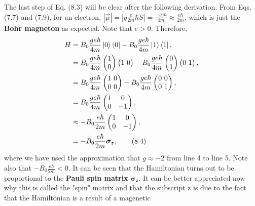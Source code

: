 \documentclass{article}
\begin{document}
The last step of Eq. (8.3) will be clear after the following derivation. From
Eqs. (7.7) and (7.9), for an electron, $|\vec{\mu}|=|g\frac{e}{2m}\hbar S|=\frac{-ge\hbar}{4m}\approx\frac{e\hbar}{2m}$,
which is just the \textbf{Bohr magneton} as expected. Note that $e>0$. Therefore,
\begin{align*}\label{eq 8.4}
    H&=B_0\frac{ge\hbar}{4m}\ket{0}\bra{0}-B_0\frac{ge\hbar}{4m}\ket{1}\bra{1},\\
    &=B_0\frac{ge\hbar}{4m}\begin{pmatrix}
        1\\0
    \end{pmatrix}
    \begin{pmatrix}
        1 \ 0
    \end{pmatrix}-B_0\frac{ge\hbar}{4m}
    \begin{pmatrix}
        0\\1
    \end{pmatrix}
    \begin{pmatrix}
        0 \ 1
    \end{pmatrix},\\
    &=B_0\frac{ge\hbar}{4m}\begin{pmatrix}
        1 \ 0\\ 0\ 0
    \end{pmatrix}-B_0\frac{ge\hbar}{4m}\begin{pmatrix}
        0\ 0\\ 0\ 1
    \end{pmatrix},\\
    &=B_0\frac{ge\hbar}{4m}\begin{pmatrix}
        1&0\\0&-1
    \end{pmatrix},\\
    &\approx -B_0\frac{e\hbar}{2m}\begin{pmatrix}
        1&0\\0&-1
    \end{pmatrix},\\
    &=-B_0\frac{e\hbar}{2m}\boldsymbol{\sigma_z},\tag{8.4}
\end{align*} 
where we have used the approximation that $g\approx-2$ from line 4 to line 5.
Note also that $-B_0\frac{e\hbar}{2m}<0$. It can be seen that the Hamiltonian
turns out to be proportional to the \textbf{Pauli spin matrix $\boldsymbol{\sigma_z}$}.
It can be better appreciated now why this is called the "spin" matrix and that the 
subscript z is due to the fact that the Hamiltonian is a result of a magenetic
\end{document}

